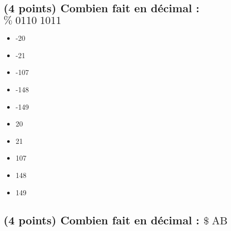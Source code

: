 \documentclass[11pt,a4paper]{article}
\begin{document}
\bigskip


\subsection{(4 points) Combien fait en décimal : $ \% \; 0110 \; 1011 $ }

\begin{table}[h!]
  \centering
  \begin{minipage}{0.45\textwidth}
\begin{itemize}
  \item[\CaseCoche] -20    \phantom{(} \\
  \item[\CaseCoche] -21    \phantom{(} \\
  \item[\CaseCoche] -107   \phantom{(} \\
  \item[\CaseCoche] -148   \phantom{(} \\
  \item[\CaseCoche] -149   \phantom{(} \\
\end{itemize}
  \end{minipage}
  \hfillx
  \begin{minipage}{0.45\textwidth}
    \centering
\begin{itemize}
  \item[\CaseCoche] 20     \phantom{(} \\
  \item[\CaseCoche] 21     \phantom{(} \\
  \item[\checkmark] 107    \phantom{(} \\  %
  \item[\CaseCoche] 148    \phantom{(} \\
  \item[\CaseCoche] 149    \phantom{(} \\
\end{itemize}
  \end{minipage}
\end{table}


\bigskip


\subsection{(4 points) Combien fait en décimal : $ \$ \; \text{AB} $ }
\end{document}
